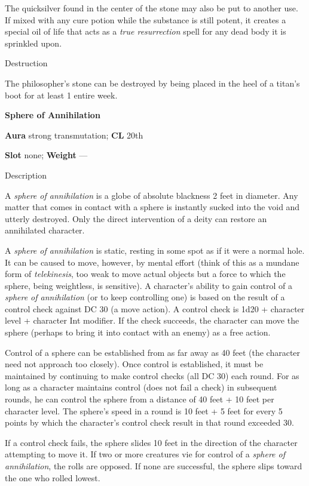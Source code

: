 The quicksilver found in the center of the stone may also be put to another use. If mixed with any cure potion while the substance is still potent, it creates a special oil of life that acts as a \textit{true resurrection} spell for any dead body it is sprinkled upon. 
				
Destruction
				
The philosopher's stone can be destroyed by being placed in the heel of a titan's boot for at least 1 entire week.
				
\textbf{Sphere of Annihilation}
				
\textbf{Aura} strong transmutation; \textbf{CL} 20th
				
\textbf{Slot} none; \textbf{Weight }---
				
Description
				
A \textit{sphere of annihilation }is a globe of absolute blackness 2 feet in diameter. Any matter that comes in contact with a sphere is instantly sucked into the void and utterly destroyed. Only the direct intervention of a deity can restore an annihilated character.
				
A \textit{sphere of annihilation} is static, resting in some spot as if it were a normal hole. It can be caused to move, however, by mental effort (think of this as a mundane form of \textit{telekinesis}, too weak to move actual objects but a force to which the sphere, being weightless, is sensitive). A character's ability to gain control of a \textit{sphere of annihilation} (or to keep controlling one) is based on the result of a control check against DC 30 (a move action). A control check is 1d20 + character level + character Int modifier. If the check succeeds, the character can move the sphere (perhaps to bring it into contact with an enemy) as a free action.
				
Control of a sphere can be established from as far away as 40 feet (the character need not approach too closely). Once control is established, it must be maintained by continuing to make control checks (all DC 30) each round. For as long as a character maintains control (does not fail a check) in subsequent rounds, he can control the sphere from a distance of 40 feet + 10 feet per character level. The sphere's speed in a round is 10 feet + 5 feet for every 5 points by which the character's control check result in that round exceeded 30.
				
If a control check fails, the sphere slides 10 feet in the direction of the character attempting to move it. If two or more creatures vie for control of a \textit{sphere of annihilation}, the rolls are opposed. If none are successful, the sphere slips toward the one who rolled lowest.
				
